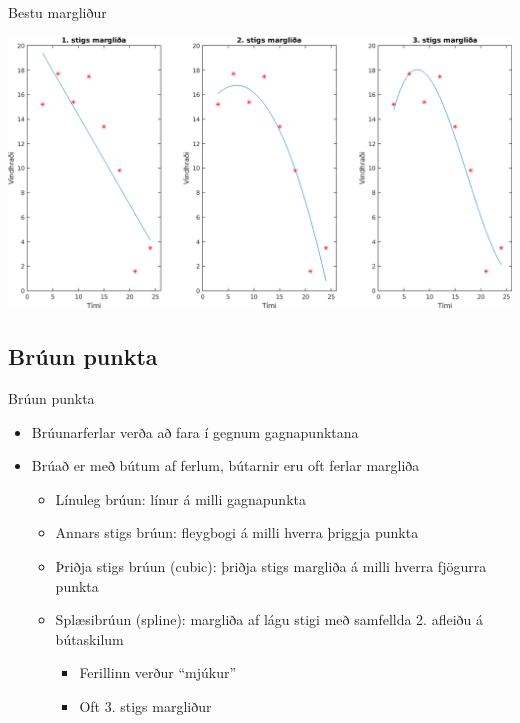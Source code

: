 \documentclass{beamer}
\begin{document}
\begin{frame}[fragile]{Bestu margliður}
\vspace{\baselineskip}
\begin{center}
\includegraphics[height=0.6\textheight]{Pics/poly-subplot}
\end{center}
\end{frame}


\subsection{Brúun punkta}

\begin{frame}[fragile]{Brúun punkta}
\begin{itemize}
 \item Brúunarferlar verða að fara í gegnum gagnapunktana
 \item Brúað er með bútum af ferlum, bútarnir eru oft ferlar margliða
 \begin{itemize}
  \item Línuleg brúun: línur á milli gagnapunkta
  \item Annars stigs brúun:  fleygbogi á milli hverra þriggja punkta
  \item Þriðja stigs brúun (cubic):  þriðja stigs margliða á milli hverra fjögurra punkta
  \item Splæsibrúun (spline): margliða af lágu stigi með samfellda 2. afleiðu á bútaskilum
  \begin{itemize}
   \item Ferillinn verður ``mjúkur''
   \item Oft 3. stigs margliður
  \end{itemize}
 \end{itemize}
\end{itemize}
\end{frame}
\end{document}
